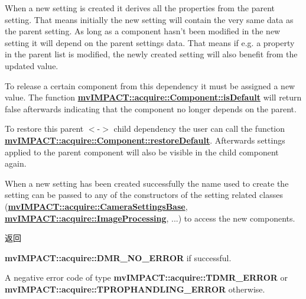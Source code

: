 When a new setting is created it derives all the properties from the parent setting. That means initially the new setting will contain the very same data as the parent setting. As long as a component hasn't been modified in the new setting it will depend on the parent settings data. That means if e.\+g. a property in the parent list is modified, the newly created setting will also benefit from the updated value.

To release a certain component from this dependency it must be assigned a new value. The function {\bfseries \hyperlink{classmv_i_m_p_a_c_t_1_1acquire_1_1_component_ae5ea06015da01ed640f4a357d90326f9}{mv\+I\+M\+P\+A\+C\+T\+::acquire\+::\+Component\+::is\+Default}} will return false afterwards indicating that the component no longer depends on the parent.

To restore this parent $<$-\/$>$ child dependency the user can call the function {\bfseries \hyperlink{classmv_i_m_p_a_c_t_1_1acquire_1_1_component_aa13d62964b8282fd66f6d4fae48f85b2}{mv\+I\+M\+P\+A\+C\+T\+::acquire\+::\+Component\+::restore\+Default}}. Afterwards settings applied to the parent component will also be visible in the child component again.

When a new setting has been created successfully the name used to create the setting can be passed to any of the constructors of the setting related classes ({\bfseries \hyperlink{classmv_i_m_p_a_c_t_1_1acquire_1_1_camera_settings_base}{mv\+I\+M\+P\+A\+C\+T\+::acquire\+::\+Camera\+Settings\+Base}}, {\bfseries \hyperlink{classmv_i_m_p_a_c_t_1_1acquire_1_1_image_processing}{mv\+I\+M\+P\+A\+C\+T\+::acquire\+::\+Image\+Processing}}, ...) to access the new components. \begin{DoxyReturn}{返回}

\begin{DoxyItemize}
\item {\bfseries mv\+I\+M\+P\+A\+C\+T\+::acquire\+::\+D\+M\+R\+\_\+\+N\+O\+\_\+\+E\+R\+R\+O\+R} if successful.
\item A negative error code of type {\bfseries mv\+I\+M\+P\+A\+C\+T\+::acquire\+::\+T\+D\+M\+R\+\_\+\+E\+R\+R\+O\+R} or {\bfseries mv\+I\+M\+P\+A\+C\+T\+::acquire\+::\+T\+P\+R\+O\+P\+H\+A\+N\+D\+L\+I\+N\+G\+\_\+\+E\+R\+R\+O\+R} otherwise. 
\end{DoxyItemize}
\end{DoxyReturn}


